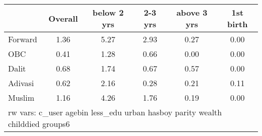 \begin{tabular}{l*{5}{c}}
\toprule
            &\multicolumn{1}{c}{Overall}&\multicolumn{1}{c}{below 2 yrs}&\multicolumn{1}{c}{2-3 yrs}&\multicolumn{1}{c}{above 3 yrs}&\multicolumn{1}{c}{1st birth}\\
\midrule
\midrule
Forward     &        1.36&        5.27&        2.93&        0.27&        0.00\\
OBC         &        0.41&        1.28&        0.66&        0.00&        0.00\\
Dalit       &        0.68&        1.74&        0.67&        0.57&        0.00\\
Adivasi     &        0.62&        2.16&        0.28&        0.21&        0.11\\
Muslim      &        1.16&        4.26&        1.76&        0.19&        0.00\\
\bottomrule
\multicolumn{6}{l}{\footnotesize rw vars: c\_user agebin less\_edu urban hasboy parity wealth childdied groups6}\\
\end{tabular}
